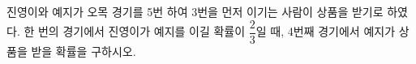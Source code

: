 진영이와 예지가 오목 경기를 5번 하여 3번을 먼저 이기는 사람이 상품을 받기로 하였다. 한 번의 경기에서 진영이가 예지를 이길 확률이 $\dfrac{2}{3}$일 때, 4번째 경기에서 예지가 상품을 받을 확률을 구하시오. 
